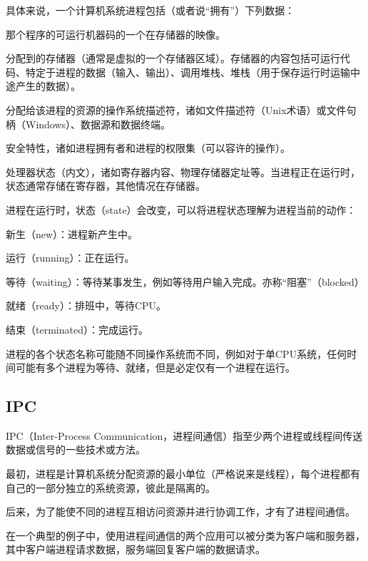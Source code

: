 具体来说，一个计算机系统进程包括（或者说“拥有”）下列数据：

\begin{compactitem}
\item 那个程序的可运行机器码的一个在存储器的映像。\
\item 分配到的存储器（通常是虚拟的一个存储器区域）。存储器的内容包括可运行代码、特定于进程的数据（输入、输出）、调用堆栈、堆栈（用于保存运行时运输中途产生的数据）。
\item 分配给该进程的资源的操作系统描述符，诸如文件描述符（Unix术语）或文件句柄（Windows）、数据源和数据终端。

\item 安全特性，诸如进程拥有者和进程的权限集（可以容许的操作）。

\item 处理器状态（内文），诸如寄存器内容、物理存储器定址等。当进程正在运行时，状态通常存储在寄存器，其他情况在存储器。
\end{compactitem}

进程在运行时，状态（state）会改变，可以将进程状态理解为进程当前的动作：

\begin{compactitem}
\item 新生（new）：进程新产生中。
\item 运行（running）：正在运行。
\item 等待（waiting）：等待某事发生，例如等待用户输入完成。亦称“阻塞”（blocked）
\item 就绪（ready）：排班中，等待CPU。
\item 结束（terminated）：完成运行。
\end{compactitem}

进程的各个状态名称可能随不同操作系统而不同，例如对于单CPU系统，任何时间可能有多个进程为等待、就绪，但是必定仅有一个进程在运行。

\subsection{IPC}

IPC（Inter-Process Communication，进程间通信）指至少两个进程或线程间传送数据或信号的一些技术或方法。

最初，进程是计算机系统分配资源的最小单位（严格说来是线程），每个进程都有自己的一部分独立的系统资源，彼此是隔离的。

后来，为了能使不同的进程互相访问资源并进行协调工作，才有了进程间通信。

在一个典型的例子中，使用进程间通信的两个应用可以被分类为客户端和服务器，其中客户端进程请求数据，服务端回复客户端的数据请求。

